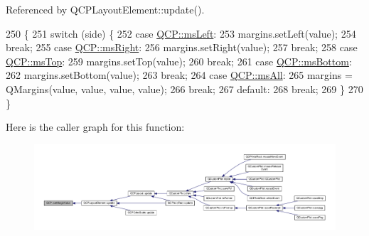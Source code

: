 Referenced by Q\+C\+P\+Layout\+Element\+::update().


\begin{DoxyCode}
250                                                                              \{
251   \textcolor{keywordflow}{switch} (side) \{
252   \textcolor{keywordflow}{case} \hyperlink{namespace_q_c_p_a7e487e3e2ccb62ab7771065bab7cae54a9500c8bfcc9e80b9dff0a8e00e867f07}{QCP::msLeft}:
253     margins.setLeft(value);
254     \textcolor{keywordflow}{break};
255   \textcolor{keywordflow}{case} \hyperlink{namespace_q_c_p_a7e487e3e2ccb62ab7771065bab7cae54a93c719593bb2b94ed244d52c86d83b65}{QCP::msRight}:
256     margins.setRight(value);
257     \textcolor{keywordflow}{break};
258   \textcolor{keywordflow}{case} \hyperlink{namespace_q_c_p_a7e487e3e2ccb62ab7771065bab7cae54a5db8fb0d0b0ecf0d611c2602a348e8a0}{QCP::msTop}:
259     margins.setTop(value);
260     \textcolor{keywordflow}{break};
261   \textcolor{keywordflow}{case} \hyperlink{namespace_q_c_p_a7e487e3e2ccb62ab7771065bab7cae54a5241d8eac2bab9524a38889f576179cc}{QCP::msBottom}:
262     margins.setBottom(value);
263     \textcolor{keywordflow}{break};
264   \textcolor{keywordflow}{case} \hyperlink{namespace_q_c_p_a7e487e3e2ccb62ab7771065bab7cae54a43d7361cb0c5244eabdc962021bffebc}{QCP::msAll}:
265     margins = QMargins(value, value, value, value);
266     \textcolor{keywordflow}{break};
267   \textcolor{keywordflow}{default}:
268     \textcolor{keywordflow}{break};
269   \}
270 \}
\end{DoxyCode}


Here is the caller graph for this function\+:\nopagebreak
\begin{figure}[H]
\begin{center}
\leavevmode
\includegraphics[width=350pt]{namespace_q_c_p_afbf6e3084c108f2bb4372107945ee82f_icgraph}
\end{center}
\end{figure}


